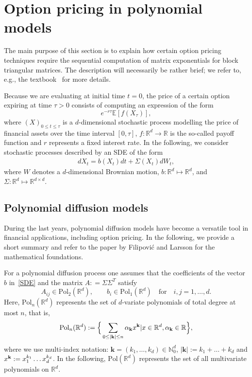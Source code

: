 \section{Option pricing in polynomial models}\label{sct3}

The main purpose of this section is to explain how certain option pricing techniques require the sequential computation of matrix exponentials for block triangular matrices. The description will necessarily be rather brief; we refer to, e.g., the textbook~\cite{Elliot2005} for more details.

Because we are evaluating at initial time $t=0$, the price of a certain option expiring at time $\tau>0$ consists of computing an expression of the form
\begin{equation}\label{priceexpectation}
e^{-r\tau} \mathbb{E}[f(X_\tau)],
\end{equation}
where $(X)_{0 \leq t \leq \tau}$ is a $d$-dimensional stochastic process modelling the price of financial assets over the time interval $[0,\tau]$, $f : \mathbb{R}^d \to \mathbb{R}$ is the so-called payoff function and $r$ represents a fixed interest rate.  In the following, we consider stochastic processes described by an SDE of the form
\begin{align}\label{SDE}
dX_t=b(X_t)dt+\Sigma(X_t)dW_t,
\end{align}
where $W$ denotes a $d$-dimensional Brownian motion, $b : \mathbb{R}^d \mapsto \mathbb{R}^{d}$, and $\Sigma : \mathbb{R}^d \mapsto \mathbb{R}^{d \times d}$. 



\subsection{Polynomial diffusion models}

During the last years, polynomial diffusion models have become a versatile tool in financial applications, including option pricing. In the following, we provide a short summary and refer to the paper by Filipovi\'c and Larsson \cite{filipovic2016polynomial} for the mathematical foundations. 

For a polynomial diffusion process one assumes that the coefficients of the vector $b$ in~\eqref{SDE} and the matrix $A : = \Sigma \Sigma^T$ satisfy
\begin{equation}\label{polynomial}
A_{ij} \in \text{Pol}_2(\mathbb{R}^d), \qquad b_i \in \text{Pol}_1(\mathbb{R}^d)  \quad \text{for} \quad i,j = 1,\ldots,d.
\end{equation}
Here, $\text{Pol}_n(\mathbb{R}^d)$ represents the set of $d$-variate polynomials of total degree at most $n$, that is,
\begin{equation*}
\text{Pol}_n(\mathbb{R}^d):= \Big\{\sum_{0 \le |\textbf{k}|\le n} \alpha_{\textbf{k}} x^{\bf{k}}| x \in \mathbb{R}^d, \alpha_{\textbf{k}} \in \mathbb{R}\Big\},
\end{equation*}
where we use multi-index notation: $\mathbf{k}=(k_1, \dots, k_d) \in \mathbb{N}_0^d$, $|\mathbf{k}|:=k_1+\dots+k_d$ and $x^{\bf{k}}:=x_1^{k_1}\dots x_d^{k_d}$. In the following, $\text{Pol}(\mathbb{R}^d)$ represents the set of all multivariate polynomials on $\mathbb{R}^d$.\

